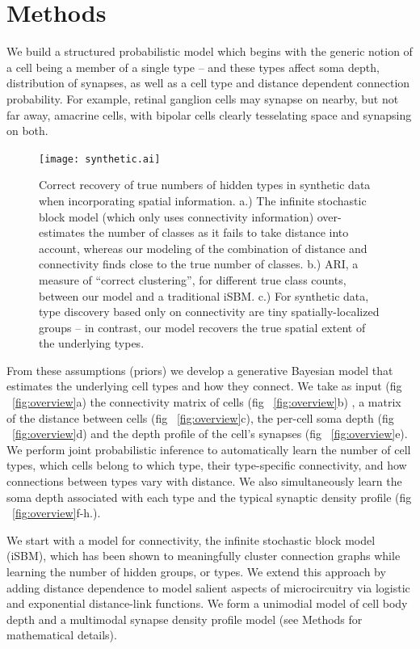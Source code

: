 \documentclass{article}
\begin{document}
\section*{Methods}


We build a structured probabilistic model which begins with the
generic notion of a cell being a member of a single type
-- and these types affect soma depth, distribution of synapses, as
well as a cell type and distance dependent connection probability. For
example, retinal ganglion cells may synapse on nearby, but not far
away, amacrine cells, with bipolar cells clearly tesselating space and
synapsing on both. 

\begin{figure}
  \centering 
  \centerline{\texttt{[image: synthetic.ai]}}
  \caption{Correct recovery of true numbers of hidden types in
    synthetic data when incorporating spatial information. a.) The
    infinite stochastic block model (which only uses connectivity
    information) over-estimates the number of classes as it fails to
    take distance into account, whereas our modeling of the
    combination of distance and connectivity finds close to the true
    number of classes. b.) ARI, a measure of ``correct clustering'',
    for different true class counts, between our model and a
    traditional iSBM. c.) For synthetic data, type discovery based
    only on connectivity are tiny spatially-localized groups -- in
    contrast, our model recovers the true spatial extent of the
    underlying types.  }
\label{fig:synthetic}
\end{figure}

From these assumptions (priors) we develop a generative Bayesian model
that estimates the underlying cell types and how they connect. We take
as input (fig ~\ref{fig:overview}a) the connectivity matrix of cells
(fig ~\ref{fig:overview}b) , a matrix of the distance between cells
(fig ~\ref{fig:overview}c), the per-cell soma depth (fig
~\ref{fig:overview}d) and the depth profile of the cell's synapses
(fig ~\ref{fig:overview}e). We perform joint probabilistic inference
to automatically learn the number of cell types, which cells belong to
which type, their type-specific connectivity, and how connections
between types vary with distance. We also simultaneously learn the
soma depth associated with each type and the typical synaptic density
profile (fig ~\ref{fig:overview}f-h.).

We start with a model for connectivity, the infinite stochastic block
model (iSBM)\autocite{Kemp2006a,Xu2006}, which has been shown to
meaningfully cluster connection graphs while learning the number of
hidden groups, or types. We extend this approach by adding distance
dependence to model salient aspects of microcircuitry via logistic and
exponential distance-link functions.  We form a unimodial model of cell
body depth and a multimodal synapse density profile model (see
Methods for mathematical details).
\end{document}
